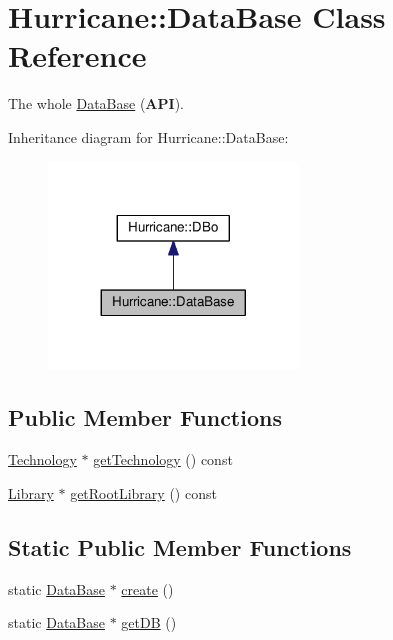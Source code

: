 \hypertarget{classHurricane_1_1DataBase}{}\section{Hurricane\+:\+:Data\+Base Class Reference}
\label{classHurricane_1_1DataBase}


The whole \hyperlink{classHurricane_1_1DataBase}{Data\+Base} ({\bfseries A\+PI}).  




Inheritance diagram for Hurricane\+:\+:Data\+Base\+:\nopagebreak
\begin{figure}[H]
\begin{center}
\leavevmode
\includegraphics[width=188pt]{classHurricane_1_1DataBase__inherit__graph}
\end{center}
\end{figure}
\subsection*{Public Member Functions}
\begin{DoxyCompactItemize}
\item 
\hyperlink{classHurricane_1_1Technology}{Technology} $\ast$ \hyperlink{classHurricane_1_1DataBase_a144480c54b0f9fbda57622ad6767ab8a}{get\+Technology} () const
\item 
\hyperlink{classHurricane_1_1Library}{Library} $\ast$ \hyperlink{classHurricane_1_1DataBase_a4469391a3c5ae82caf090f1bdac4f29b}{get\+Root\+Library} () const
\end{DoxyCompactItemize}
\subsection*{Static Public Member Functions}
\begin{DoxyCompactItemize}
\item 
static \hyperlink{classHurricane_1_1DataBase}{Data\+Base} $\ast$ \hyperlink{classHurricane_1_1DataBase_af0210f9bb13faf06e12eb135eeea9b06}{create} ()
\item 
static \hyperlink{classHurricane_1_1DataBase}{Data\+Base} $\ast$ \hyperlink{classHurricane_1_1DataBase_a53d0b9fcd06b73f3968c8f238f377a88}{get\+DB} ()
\end{DoxyCompactItemize}


